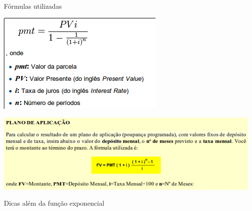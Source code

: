 \documentclass[]{beamer}
\begin{document}
\begin{frame}{\foreignlanguage{brazil}{Fórmulas utilizadas}}

\begin{center}
\includegraphics[scale=0.5]{price}
\par\end{center}

\begin{center}
\includegraphics[scale=0.55]{poupprog}
\par\end{center}

\end{frame}


\begin{frame}[standout]{Dicas além da função exponencial }

\end{frame}
\end{document}
